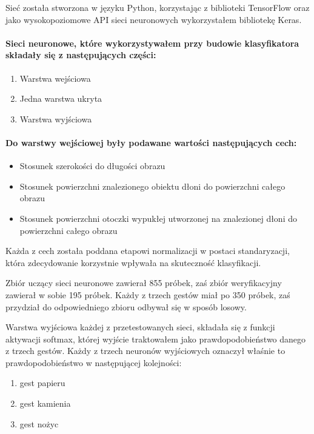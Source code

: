 \documentclass[a4paper,12pt,twoside,openany]{report}
\begin{document}
	Sieć została stworzona w języku Python, korzystając z biblioteki TensorFlow oraz jako wysokopoziomowe API sieci neuronowych wykorzystałem bibliotekę Keras.
	
	\paragraph{Sieci neuronowe, które wykorzystywałem przy budowie klasyfikatora składały się z następujących części:}
	\begin{enumerate}
		\item Warstwa wejściowa
		\item Jedna warstwa ukryta
		\item Warstwa wyjściowa
	\end{enumerate}

	\paragraph{Do warstwy wejściowej były podawane wartości następujących cech:}
	\begin{itemize}
		\item Stosunek szerokości do długości obrazu
		\item Stosunek powierzchni znalezionego obiektu dłoni do powierzchni całego obrazu
		\item Stosunek powierzchni otoczki wypukłej utworzonej na znalezionej dłoni do powierzchni całego obrazu
	\end{itemize}
	\noindent
	Każda z cech została poddana etapowi normalizacji w postaci standaryzacji, która zdecydowanie korzystnie wpływała na skuteczność klasyfikacji.
	
	Zbiór uczący sieci neuronowe zawierał 855 próbek, zaś zbiór weryfikacyjny zawierał w sobie 195 próbek. Każdy z trzech gestów miał po 350 próbek, zaś przydział do odpowiedniego zbioru odbywał się w sposób losowy.
	
	Warstwa wyjściowa każdej z przetestowanych sieci, składała się z funkcji aktywacji softmax, której wyjście traktowałem jako prawdopodobieństwo danego z trzech gestów. Każdy z trzech neuronów wyjściowych oznaczył właśnie to prawdopodobieństwo w następującej kolejności:
	\begin{enumerate}
		\item gest papieru
		\item gest kamienia
		\item gest nożyc
	\end{enumerate}
	
\end{document}
